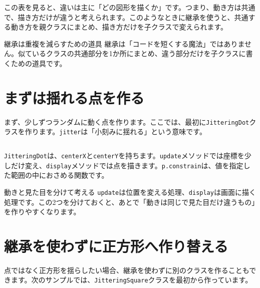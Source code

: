 この表を見ると、違いは主に「どの図形を描くか」です。つまり、動き方は共通で、描き方だけが違うと考えられます。このようなときに継承を使うと、共通する動き方を親クラスにまとめ、描き方だけを子クラスで変えられます。

\begin{notebox}{継承は重複を減らすための道具}
継承は「コードを短くする魔法」ではありません。似ているクラスの共通部分を1か所にまとめ、違う部分だけを子クラスに書くための道具です。
\end{notebox}

\section{まずは揺れる点を作る}

まず、少しずつランダムに動く点を作ります。ここでは、最初に\texttt{JitteringDot}クラスを作ります。\texttt{jitter}は「小刻みに揺れる」という意味です。

\begin{listing}[htbp]
\inputminted{ts}{typescript-p5/listings/chapter14/jittering-dot.ts}
\caption{少しずつランダムに動く点（\texttt{chapter14/jittering-dot.ts}）}
\label{lst:chapter14-jittering-dot}
\end{listing}

\texttt{JitteringDot}は、\texttt{centerX}と\texttt{centerY}を持ちます。\texttt{update}メソッドでは座標を少しだけ変え、\texttt{display}メソッドでは点を描きます。\texttt{p.constrain}は、値を指定した範囲の中におさめる関数です。

\begin{pointbox}{動きと見た目を分けて考える}
\texttt{update}は位置を変える処理、\texttt{display}は画面に描く処理です。この2つを分けておくと、あとで「動きは同じで見た目だけ違うもの」を作りやすくなります。
\end{pointbox}

\section{継承を使わずに正方形へ作り替える}

点ではなく正方形を揺らしたい場合、継承を使わずに別のクラスを作ることもできます。次のサンプルでは、\texttt{JitteringSquare}クラスを最初から作っています。

\begin{listing}[htbp]
\inputminted{ts}{typescript-p5/listings/chapter14/jittering-square-without-inheritance.ts}
\caption{継承を使わずに揺れる正方形を作る（\texttt{chapter14/jittering-square-without-inheritance.ts}）}
\label{lst:chapter14-jittering-square-without-inheritance}
\end{listing}

